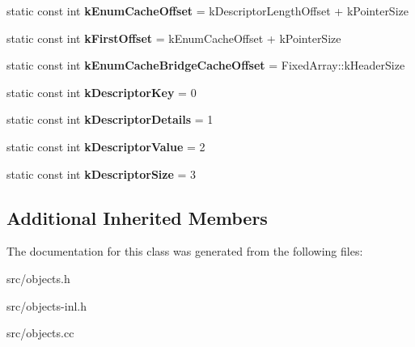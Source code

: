 \begin{DoxyCompactItemize}
\item 
\hypertarget{classv8_1_1internal_1_1_descriptor_array_ae113d24b60ad38967081035eeac6814c}{}static const int {\bfseries k\+Enum\+Cache\+Offset} = k\+Descriptor\+Length\+Offset + k\+Pointer\+Size\label{classv8_1_1internal_1_1_descriptor_array_ae113d24b60ad38967081035eeac6814c}

\item 
\hypertarget{classv8_1_1internal_1_1_descriptor_array_af13deaee1d816c14f74112c3400e3aff}{}static const int {\bfseries k\+First\+Offset} = k\+Enum\+Cache\+Offset + k\+Pointer\+Size\label{classv8_1_1internal_1_1_descriptor_array_af13deaee1d816c14f74112c3400e3aff}

\item 
\hypertarget{classv8_1_1internal_1_1_descriptor_array_aa51c4630bb6cafb0b90b91ad6ef76544}{}static const int {\bfseries k\+Enum\+Cache\+Bridge\+Cache\+Offset} = Fixed\+Array\+::k\+Header\+Size\label{classv8_1_1internal_1_1_descriptor_array_aa51c4630bb6cafb0b90b91ad6ef76544}

\item 
\hypertarget{classv8_1_1internal_1_1_descriptor_array_a6587e89cced93cbd6b336639350363f1}{}static const int {\bfseries k\+Descriptor\+Key} = 0\label{classv8_1_1internal_1_1_descriptor_array_a6587e89cced93cbd6b336639350363f1}

\item 
\hypertarget{classv8_1_1internal_1_1_descriptor_array_a0ba69adacdf93ff512c22c3ae2e144ff}{}static const int {\bfseries k\+Descriptor\+Details} = 1\label{classv8_1_1internal_1_1_descriptor_array_a0ba69adacdf93ff512c22c3ae2e144ff}

\item 
\hypertarget{classv8_1_1internal_1_1_descriptor_array_a8882801aface5ebfa806fea3b9933fe8}{}static const int {\bfseries k\+Descriptor\+Value} = 2\label{classv8_1_1internal_1_1_descriptor_array_a8882801aface5ebfa806fea3b9933fe8}

\item 
\hypertarget{classv8_1_1internal_1_1_descriptor_array_a410254caab1893829034a59370066eed}{}static const int {\bfseries k\+Descriptor\+Size} = 3\label{classv8_1_1internal_1_1_descriptor_array_a410254caab1893829034a59370066eed}

\end{DoxyCompactItemize}
\subsection*{Additional Inherited Members}


The documentation for this class was generated from the following files\+:\begin{DoxyCompactItemize}
\item 
src/objects.\+h\item 
src/objects-\/inl.\+h\item 
src/objects.\+cc\end{DoxyCompactItemize}
